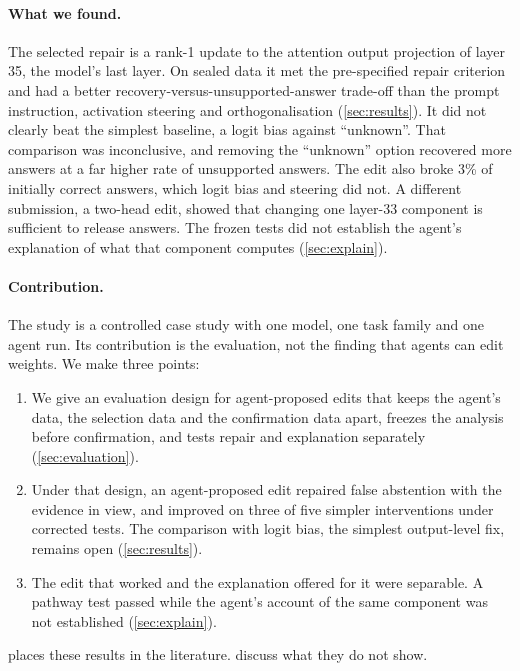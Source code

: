\paragraph{What we found.}
The selected repair is a rank-1 update to the attention output projection of layer 35, the model's last layer. On
sealed data it met the pre-specified repair criterion and had a better recovery-versus-unsupported-answer trade-off
than the prompt instruction, activation steering and orthogonalisation (\cref{sec:results}). It did not clearly
beat the simplest baseline, a logit bias against ``unknown''. That comparison was inconclusive, and removing the
``unknown'' option recovered more answers at a far higher rate of unsupported answers. The edit also broke 3\% of
initially correct answers, which logit bias and steering did not. A different submission, a two-head edit, showed that
changing one layer-33 component is sufficient to release answers. The frozen tests did not establish the agent's
explanation of what that component computes (\cref{sec:explain}).

\paragraph{Contribution.}
The study is a controlled case study with one model, one task family and one agent run. Its contribution is the
evaluation, not the finding that agents can edit weights. We make three points:
\begin{enumerate}[leftmargin=*]
  \item We give an evaluation design for agent-proposed edits that keeps the agent's data, the selection data and
        the confirmation data apart, freezes the analysis before confirmation, and tests repair and explanation
        separately (\cref{sec:evaluation}).
  \item Under that design, an agent-proposed edit repaired false abstention with the evidence in view, and improved
        on three of five simpler interventions under corrected tests. The comparison with logit bias, the simplest
        output-level fix, remains open (\cref{sec:results}).
  \item The edit that worked and the explanation offered for it were separable. A pathway test passed while the
        agent's account of the same component was not established (\cref{sec:explain}).
\end{enumerate}
 places these results in the literature.  discuss what they do
not show.
